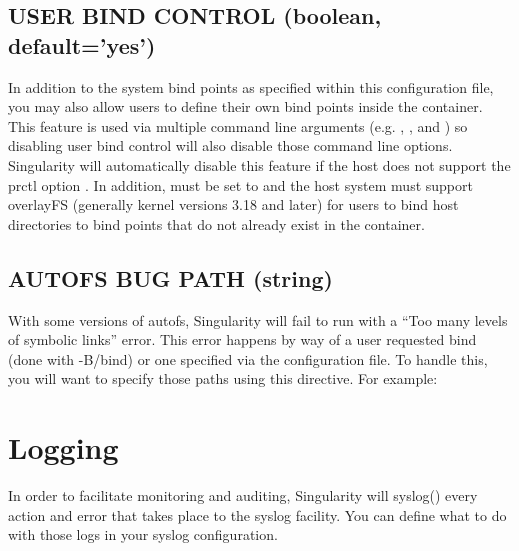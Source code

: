 \documentclass[letterpaper,10pt,english]{sphinxmanual}
\begin{document}
\subsection{USER BIND CONTROL (boolean, default=’yes’)}
\label{\detokenize{the_singularity_config_file:user-bind-control-boolean-default-yes}}
In addition to the system bind points as specified within this
configuration file, you may also allow users to define their own bind
points inside the container. This feature is used via multiple command
line arguments (e.g. ,  , and ) so disabling user bind control will
also disable those command line options.
Singularity will automatically disable this feature if the host does
not support the prctl option . In addition,  must be set to  and the
host system must support overlayFS (generally kernel versions 3.18 and
later) for users to bind host directories to bind points that do not
already exist in the container.


\subsection{AUTOFS BUG PATH (string)}
\label{\detokenize{the_singularity_config_file:autofs-bug-path-string}}
With some versions of autofs, Singularity will fail to run with a “Too
many levels of symbolic links” error. This error happens by way of a
user requested bind (done with -B/\textendash{}bind) or one specified via the
configuration file. To handle this, you will want to specify those
paths using this directive. For example:

%
\begin{sphinxVerbatim}[commandchars=\\\{\}]
    
\end{sphinxVerbatim}


\section{Logging}
\label{\detokenize{the_singularity_config_file:logging}}
In order to facilitate monitoring and auditing, Singularity will
syslog() every action and error that takes place to the  syslog facility.
You can define what to do with those logs in your syslog configuration.
\end{document}
